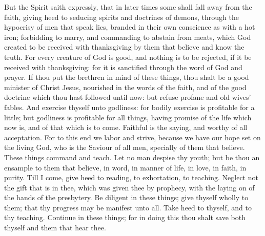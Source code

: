 But the Spirit saith expressly, that in later times some shall fall away from the faith, giving heed to seducing spirits and doctrines of demons, through the hypocrisy of men that speak lies, branded in their own conscience as with a hot iron; forbidding to marry, and commanding to abstain from meats, which God created to be received with thanksgiving by them that believe and know the truth. For every creature of God is good, and nothing is to be rejected, if it be received with thanksgiving: for it is sanctified through the word of God and prayer.  If thou put the brethren in mind of these things, thou shalt be a good minister of Christ Jesus, nourished in the words of the faith, and of the good doctrine which thou hast followed until now: but refuse profane and old wives’ fables. And exercise thyself unto godliness: for bodily exercise is profitable for a little; but godliness is profitable for all things, having promise of the life which now is, and of that which is to come. Faithful is the saying, and worthy of all acceptation. For to this end we labor and strive, because we have our hope set on the living God, who is the Saviour of all men, specially of them that believe. These things command and teach. Let no man despise thy youth; but be thou an ensample to them that believe, in word, in manner of life, in love, in faith, in purity. Till I come, give heed to reading, to exhortation, to teaching. Neglect not the gift that is in thee, which was given thee by prophecy, with the laying on of the hands of the presbytery. Be diligent in these things; give thyself wholly to them; that thy progress may be manifest unto all. Take heed to thyself, and to thy teaching. Continue in these things; for in doing this thou shalt save both thyself and them that hear thee. 

